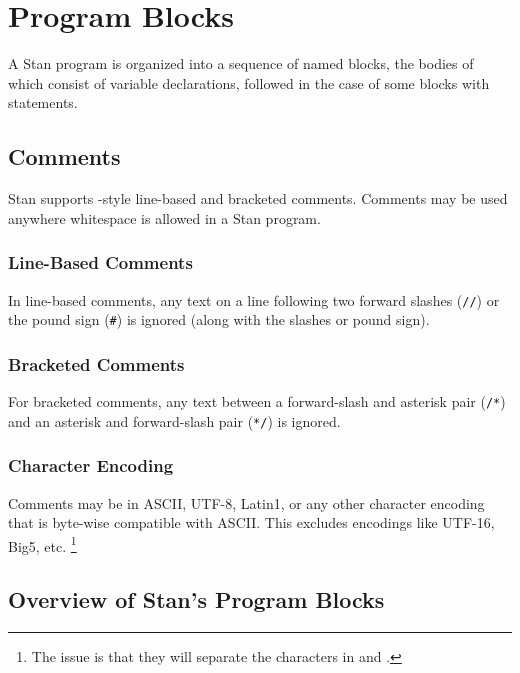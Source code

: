 \chapter{Program Blocks}\label{blocks.chapter}

\noindent
A Stan program is organized into a sequence of named blocks, the
bodies of which consist of variable declarations, followed in the case
of some blocks with statements.

\section{Comments}\label{comments.section}

Stan supports \Cpp-style line-based and bracketed comments.  Comments
may be used anywhere whitespace is allowed in a Stan program.

\subsection{Line-Based Comments}

In line-based comments, any text on a line following
two forward slashes (\Verb|//|) or the pound sign (\Verb|#|)
is ignored (along with the slashes or pound sign).

\subsection{Bracketed Comments}

For bracketed comments, any text between a forward-slash and asterisk
pair (\Verb|/*|) and an asterisk and forward-slash pair (\Verb|*/|) is
ignored.

\subsection{Character Encoding}

Comments may be in ASCII, UTF-8, Latin1, or any other character
encoding that is byte-wise compatible with ASCII.  This excludes
encodings like UTF-16, Big5, etc.%
%
\footnote{The issue is that they will separate the characters in
  \code{*/} and \code{*/}.}


\section{Overview of Stan's Program Blocks}


